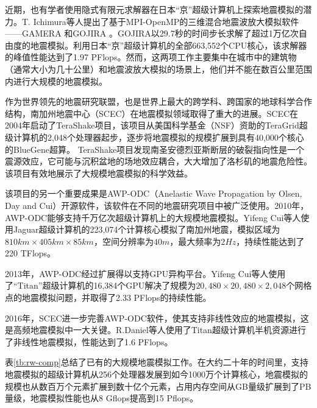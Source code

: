 近期，也有学者使用隐式有限元求解器\cite{geradin1983implicit}在日本“京”超级计算机\cite{yokokawa2011k}上探索地震模拟的潜力。T. Ichimura等人提出了基于MPI-OpenMP的三维混合地震波放大模拟软件——GAMERA \citep {ichimura2014physics}和GOJIRA \citep {ichimura2015implicit}。GOJIRA以29.7秒的时间步长求解了超过1万亿次自由度的地震模拟。利用日本“京”超级计算机的全部663,552个CPU核心，该求解器的峰值性能达到了1.97 PFlops。然而，这两项工作主要集中在城市中的建筑物（通常大小为几十公里）和地震波放大模拟的场景上，他们并不能在数百公里范围内进行大规模的地震模拟。

作为世界领先的地震研究联盟，也是世界上最大的跨学科、跨国家的地球科学合作结构，南加州地震中心（SCEC）在地震模拟领域取得了重大的进展。SCEC在2004年启动了TeraShake项目，该项目从美国科学基金（NSF）资助的TeraGrid超级计算机\citep{teragrid}的2,048个处理器起步，逐步将地震模拟的规模扩展到具有40,000个核心的BlueGene超算\cite{adiga2002overview}。
TeraShake项目发现南圣安德烈亚斯断层的破裂指向性是一个震源效应，它可能与沉积盆地的场地效应耦合，大大增加了洛杉矶的地震危险性。该项目有效地展示了大规模地震模拟的科学效益。

该项目的另一个重要成果是AWP-ODC\cite{awpodc}（Anelastic Wave Propagation by Olsen, Day and Cui）开源软件，该软件在不同的地震研究项目中被广泛使用。2010年，AWP-ODC能够支持千万亿次超级计算机上的大规模地震模拟\citep{cui2010scalable}。Yifeng Cui等人使用Jaguar超级计算机的223,074个计算核心模拟了南加州地震，模拟区域为$810km\times 405km\times 85km$，空间分辨率为$40m$，最大频率为$2Hz$，持续性能达到了220 TFlops。

2013年，AWP-ODC经过扩展得以支持GPU异构平台。Yifeng Cui等人使用了“Titan”超级计算机的16,384个GPU解决了规模为$20,480\times20,480\times2,048$个网格点的地震模拟问题，并取得了2.33 PFlops的持续性能。

2016年，SCEC进一步完善AWP-ODC软件，使其支持非线性效应的地震模拟，这是高频地震模拟中一大关键。R.Daniel等人使用了Titan超级计算机半机资源进行了非线性地震模拟\citep{roten2016high}，性能达到了1.6 PFlops。

表\ref{tb:rw-comp}总结了已有的大规模地震模拟工作。在大约二十年的时间里，支持地震模拟的超级计算机从256个处理器发展到如今1000万个计算核心，地震模拟的规模也从数百万个元素扩展到数十亿个元素，占用内存空间从GB量级扩展到了PB量级，地震模拟性能也从8 Gflops提高到15 Pflops。

